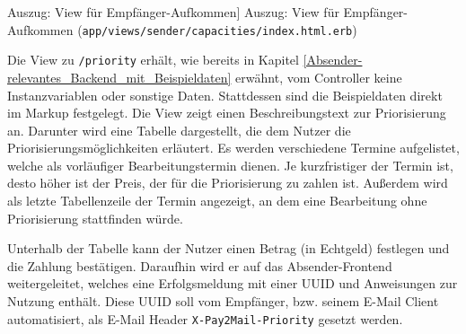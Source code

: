 \begin{listing}[!ht]
\inputminted[firstline=43, lastline=55, linenos]{erb}{Listings/Prototype/capacities_index.html.erb}

\caption
    [Auszug: View für Empfänger-Aufkommen]
    {Auszug: View für Empfänger-Aufkommen (\texttt{app/views/sender/capacities/index.html.erb})}

\label{lst:capacities/index}
\end{listing}

\noindent Die View zu \texttt{/priority} erhält, wie bereits in Kapitel \ref{Absender-relevantes_Backend_mit_Beispieldaten} erwähnt, vom Controller keine Instanzvariablen oder sonstige Daten. Stattdessen sind die Beispieldaten direkt im Markup festgelegt. Die View zeigt einen Beschreibungstext zur Priorisierung an. Darunter wird eine Tabelle dargestellt, die dem Nutzer die Priorisierungsmöglichkeiten erläutert. Es werden verschiedene Termine aufgelistet, welche als vorläufiger Bearbeitungstermin dienen. Je kurzfristiger der Termin ist, desto höher ist der Preis, der für die Priorisierung zu zahlen ist. Außerdem wird als letzte Tabellenzeile der Termin angezeigt, an dem eine Bearbeitung ohne Priorisierung stattfinden würde.

Unterhalb der Tabelle kann der Nutzer einen Betrag (in Echtgeld) festlegen und die Zahlung bestätigen. Daraufhin wird er auf das Absender-Frontend weitergeleitet, welches eine Erfolgsmeldung mit einer UUID und Anweisungen zur Nutzung enthält. Diese UUID soll vom Empfänger, bzw. seinem E-Mail Client automatisiert, als E-Mail Header \texttt{X-Pay2Mail-Priority} gesetzt werden. 